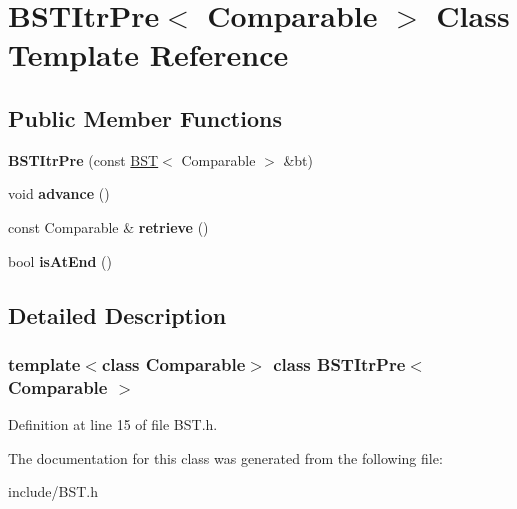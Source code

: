 \hypertarget{classBSTItrPre}{}\section{B\+S\+T\+Itr\+Pre$<$ Comparable $>$ Class Template Reference}
\label{classBSTItrPre}
\subsection*{Public Member Functions}
\begin{DoxyCompactItemize}
\item 
\mbox{\label{classBSTItrPre_a11b1cd4e783f153b9c1b64ce2ec8077e}} 
{\bfseries B\+S\+T\+Itr\+Pre} (const \hyperlink{classBST}{B\+ST}$<$ Comparable $>$ \&bt)
\item 
\mbox{\label{classBSTItrPre_a7a743d66a842018fd833fb2b0737254d}} 
void {\bfseries advance} ()
\item 
\mbox{\label{classBSTItrPre_ace3c36566d09f71eff8807c9a4fff7fe}} 
const Comparable \& {\bfseries retrieve} ()
\item 
\mbox{\label{classBSTItrPre_ae282a7b9ffa9d250bb0f6a6d79f6e8d0}} 
bool {\bfseries is\+At\+End} ()
\end{DoxyCompactItemize}


\subsection{Detailed Description}
\subsubsection*{template$<$class Comparable$>$\newline
class B\+S\+T\+Itr\+Pre$<$ Comparable $>$}



Definition at line 15 of file B\+S\+T.\+h.



The documentation for this class was generated from the following file\+:\begin{DoxyCompactItemize}
\item 
include/B\+S\+T.\+h\end{DoxyCompactItemize}
